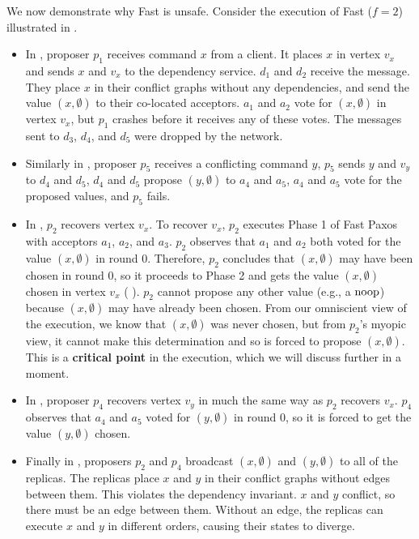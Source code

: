 We now demonstrate why Fast \BPaxos{} is unsafe. Consider the execution of Fast
\BPaxos{} ($f = 2$) illustrated in .
\begin{itemize}
  \item
    In , proposer $p_1$ receives command $x$ from a
    client. It places $x$ in vertex $v_x$ and sends $x$ and $v_x$ to the
    dependency service. $d_1$ and $d_2$ receive the message. They place $x$ in
    their conflict graphs without any dependencies, and send the value $(x,
    \emptyset{})$ to their co-located acceptors. $a_1$ and $a_2$ vote for $(x,
    \emptyset)$ in vertex $v_x$, but $p_1$ crashes before it receives any of
    these votes. The messages sent to $d_3$, $d_4$, and $d_5$ were dropped by
    the network.

  \item
    Similarly in , proposer $p_5$ receives a conflicting
    command $y$, $p_5$ sends $y$ and $v_y$ to $d_4$ and $d_5$, $d_4$ and $d_5$
    propose $(y, \emptyset{})$  to $a_4$ and $a_5$, $a_4$ and $a_5$ vote for
    the proposed values, and $p_5$ fails.

  \item
    In , $p_2$ recovers vertex $v_x$. To recover $v_x$,
    $p_2$ executes Phase 1 of Fast Paxos with acceptors $a_1$, $a_2$, and
    $a_3$. $p_2$ observes that $a_1$ and $a_2$ both voted for the value $(x,
    \emptyset{})$ in round $0$. Therefore, $p_2$ concludes that $(x,
    \emptyset{})$ may have been chosen in round $0$, so it proceeds to Phase 2
    and gets the value $(x, \emptyset)$ chosen in vertex $v_x$
    ( ). $p_2$ cannot propose any
    other value (e.g., a $\text{noop}$) because $(x, \emptyset{})$ may have already
    been chosen. From our omniscient view of the execution, we know that $(x,
    \emptyset)$ was never chosen, but from $p_2$'s myopic view, it cannot make
    this determination and so is forced to propose $(x, \emptyset{})$. This is
    a \textbf{critical point} in the execution, which we will discuss further
    in a moment.

  \item
    In , proposer $p_4$ recovers vertex $v_y$ in much
    the same way as $p_2$ recovers $v_x$. $p_4$ observes that $a_4$ and $a_5$
    voted for $(y, \emptyset)$ in round 0, so it is forced to get the value
    $(y, \emptyset{})$ chosen.

  \item
    Finally in , proposers $p_2$ and $p_4$ broadcast $(x,
    \emptyset)$ and $(y, \emptyset)$ to all of the replicas. The replicas place
    $x$ and $y$ in their conflict graphs without edges between them. This
    violates the dependency invariant. $x$ and $y$ conflict, so there must be
    an edge between them. Without an edge, the replicas can execute $x$ and $y$
    in different orders, causing their states to diverge.
\end{itemize}

